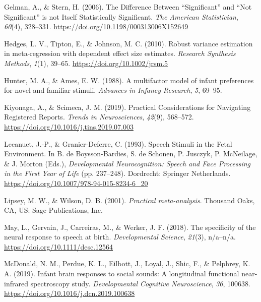 \documentclass[man,floatsintext]{apa6}
\begin{document}
\leavevmode\hypertarget{ref-gelman_difference_2006}{}%
Gelman, A., \& Stern, H. (2006). The Difference Between ``Significant'' and ``Not Significant'' is not Itself Statistically Significant. \emph{The American Statistician}, \emph{60}(4), 328--331. \url{https://doi.org/10.1198/000313006X152649}

\leavevmode\hypertarget{ref-hedges_robust_2010}{}%
Hedges, L. V., Tipton, E., \& Johnson, M. C. (2010). Robust variance estimation in meta-regression with dependent effect size estimates. \emph{Research Synthesis Methods}, \emph{1}(1), 39--65. \url{https://doi.org/10.1002/jrsm.5}

\leavevmode\hypertarget{ref-hunter_multifactor_1988}{}%
Hunter, M. A., \& Ames, E. W. (1988). A multifactor model of infant preferences for novel and familiar stimuli. \emph{Advances in Infancy Research}, \emph{5}, 69--95.

\leavevmode\hypertarget{ref-kiyonaga_practical_2019}{}%
Kiyonaga, A., \& Scimeca, J. M. (2019). Practical Considerations for Navigating Registered Reports. \emph{Trends in Neurosciences}, \emph{42}(9), 568--572. \url{https://doi.org/10.1016/j.tins.2019.07.003}

\leavevmode\hypertarget{ref-lecanuet_speech_1993}{}%
Lecanuet, J.-P., \& Granier-Deferre, C. (1993). Speech Stimuli in the Fetal Environment. In B. de Boysson-Bardies, S. de Schonen, P. Jusczyk, P. McNeilage, \& J. Morton (Eds.), \emph{Developmental Neurocognition: Speech and Face Processing in the First Year of Life} (pp. 237--248). Dordrecht: Springer Netherlands. \url{https://doi.org/10.1007/978-94-015-8234-6_20}

\leavevmode\hypertarget{ref-lipsey_practical_2001}{}%
Lipsey, M. W., \& Wilson, D. B. (2001). \emph{Practical meta-analysis}. Thousand Oaks, CA, US: Sage Publications, Inc.

\leavevmode\hypertarget{ref-may_specificity_2018}{}%
May, L., Gervain, J., Carreiras, M., \& Werker, J. F. (2018). The specificity of the neural response to speech at birth. \emph{Developmental Science}, \emph{21}(3), n/a--n/a. \url{https://doi.org/10.1111/desc.12564}

\leavevmode\hypertarget{ref-mcdonald_infant_2019}{}%
McDonald, N. M., Perdue, K. L., Eilbott, J., Loyal, J., Shic, F., \& Pelphrey, K. A. (2019). Infant brain responses to social sounds: A longitudinal functional near-infrared spectroscopy study. \emph{Developmental Cognitive Neuroscience}, \emph{36}, 100638. \url{https://doi.org/10.1016/j.dcn.2019.100638}
\end{document}
